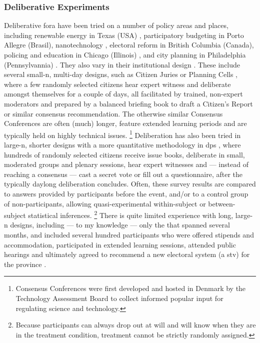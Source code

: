 \subsubsection{Deliberative Experiments}
Deliberative fora have been tried on a number of policy areas and places, including renewable energy in Texas (USA) \citep{LehrGuild-2003-aa}, participatory budgeting in Porto Allegre \citep{CoelhoPozzono-2005-aa} (Brasil), nanotechnology \citep{Powell2008}, electoral reform in British Columbia (Canada), policing and education in Chicago (Illinois) \citep{WarrenPearse-2008-aa}, and city planning in Philadelphia (Pennsylvannia) \citep{Sokoloff2005}.
They also vary in their institutional design \citep[reviewed in][]{Fung-2003-ac}.
These include several small-n, multi-day designs, such as Citizen Juries \citep{SmithWales-2000-aa} or Planning Cells \citep{Dienel-1999-aa}, where a few randomly selected citizens hear expert witness and deliberate amongst themselves for a couple of days, all facilitated by trained, non-expert moderators and prepared by a balanced briefing book to draft a Citizen's Report or similar consensus recommendation.
The otherwise similar Consensus Conferences \citep{Einsiedel2000} are often (much) longer, feature extended learning periods and are typically held on highly technical issues.
\footnote{
	Consensus Conferences were first developed and hosted in Denmark by the Technology Assessment Board to collect informed popular input for regulating science and technology.
}
Deliberation has also been tried in large-n, shorter designs with a more quantitative methodology in \gls{dp}s \citep{FishkinFarrar-2005-aa}, where hundreds of randomly selected citizens receive issue books, deliberate in small, moderated groups and plenary sessions, hear expert witnesses and --- instead of reaching a consensus --- cast a secret vote or fill out a questionnaire, after the typically daylong deliberation concludes.
Often, these survey results are compared to answers provided by participants before the event, and/or to a control group of non-participants, allowing quasi-experimental within-subject or between-subject statistical inferences.
\footnote{
	Because participants can always drop out at will and will know when they are in the treatment condition, treatment cannot be strictly randomly assigned.
}
There is quite limited experience with long, large-n designs, including --- to my knowledge --- only the  \citep{WarrenPearse-2008-aa} that spanned several months, and included several hundred participants who were offered stipends and accommodation, participated in extended learning sessions, attended public hearings and ultimately agreed to recommend a new electoral system (a \gls{stv}) for the province \citep{Citizen-2004-aa}.

